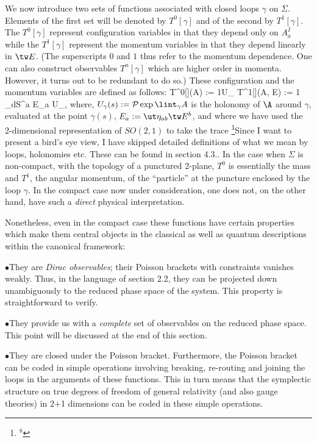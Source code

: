 We now introduce two sets of functions associated with closed loops $\gamma$
on $\Sigma$. Elements of the first set will be denoted by $T^0[\gamma ]$
and of the second by $T^1[\gamma]$. The $T^0[\gamma ]$ represent configuration
variables in that they depend only on $A_a^I$ while the $T^1[\gamma ]$
represent the momentum variables in that they depend linearly in $\tw E$.
(The superscripts $0$ and $1$ thus refer to the momentum dependence. One can
also construct observables $T^n[\gamma ]$ which are higher order in momenta.
However, it turns out to be redundant to do so.) These configuration and the
momentum variables are defined as follows:
\bneq
T^0[\gamma ](A) := {1}\tr U_\gamma {} \qquad
T^1[\gamma ](A, \tw E) := {1} \loint_\gamma dS^a\> \tr E_a U_\gamma ,
where, $U_\gamma (s) := {\cal P}\exp\lint_\gamma A$ is the holonomy of $\A$
around $\gamma$, evaluated at the point $\gamma (s)$, $E_a := \ut\eta_{ab}
\tw E^b$, and where we have used the 2-dimensional representation of $SO(2,1)$
to take the trace
\footnote{$^8$}{Since I want to present a bird's eye view, I have skipped
detailed definitions of what we mean by loops, holonomies etc. These can be
found in section 4.3.}.
In the case when $\Sigma$ is non-compact, with the
topology of a punctured 2-plane, $T^0$ is essentially the mass and $T^1$, the
angular momentum, of the ``particle'' at the puncture enclosed by the loop
$\gamma$. In the compact case now under consideration, one does not,
on the other hand, have such a {\it direct} physical interpretation.

Nonetheless, even in the compact case these functions have certain properties
which make them central objects in the classical as well as quantum
descriptions within the canonical framework:
\item{$\bullet$}{They are {\it Dirac observables}; their Poisson brackets
with constraints vanishes weakly. Thus, in the language of section 2.2, they
can be projected down unambiguously to the reduced phase space of the system.
This property is straightforward to verify.}
\item{$\bullet$}{They provide us with a {\it complete} set of observables on
the reduced phase space. This point will be discussed at the end of this
section.}
\item{$\bullet$}{They are closed under the Poisson bracket. Furthermore, the
Poisson bracket can be coded in simple operations involving breaking,
re-routing and joining the loops in the arguments of these functions. This
in turn means that the symplectic structure on true degrees of freedom of
general relativity (and also gauge theories) in 2+1 dimensions can be coded
in these simple operations.}

